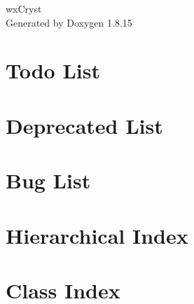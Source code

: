 \let\mypdfximage\pdfximage\def\pdfximage{\immediate\mypdfximage}\documentclass[twoside]{book}
\newcommand{\+}{\discretionary{\mbox{\scriptsize$\hookleftarrow$}}{}{}}
\newcommand{\clearemptydoublepage}{%
  \newpage{\pagestyle{empty}\cleardoublepage}%
}
\begin{document}
\hypersetup{pageanchor=false,
             bookmarksnumbered=true,
             pdfencoding=unicode
            }
\begin{titlepage}
\vspace*{7cm}
\begin{center}%
{\Large wx\+Cryst }\\
\vspace*{1cm}
{\large Generated by Doxygen 1.8.15}\\
\end{center}
\end{titlepage}
\clearemptydoublepage
{}
\tableofcontents
\clearemptydoublepage
{}
\hypersetup{pageanchor=true}

\chapter{Todo List}
\label{todo}

\chapter{Deprecated List}
\label{deprecated}

\chapter{Bug List}
\label{bug}

\chapter{Hierarchical Index}

\chapter{Class Index}

\end{document}
